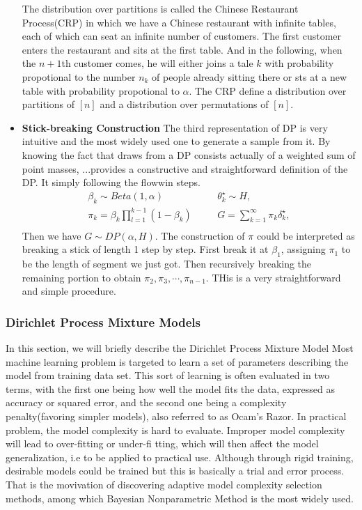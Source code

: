 \documentclass[a4paper,14pt]{article}
\begin{document}
\begin{itemize}
	The distribution over partitions is called the Chinese Restaurant Process(CRP) in which we have a Chinese restaurant with infinite tables, each of which can seat an infinite number of customers. The first customer enters the restaurant and sits at the first table. And in the following, when the $n+1$th customer comes, he will either joins a tale $k$ with probability propotional to the number $n_k$ of people already sitting there or sts at a new table with probability propotional to $\alpha$. The CRP define a distribution over partitions of $[n]$ and a distribution over permutations of $[n]$. 
	\item \textbf{Stick-breaking Construction} 
	The  third representation of DP is very intuitive and the most widely used one to generate a sample from it. By knowing the fact that draws from a DP consists actually of a weighted sum of point masses, ...provides a constructive and straightforward definition of the DP. It simply following the flowwin steps.
	\begin{eqnarray}
	\beta_k\sim Beta(1,\alpha)&\quad&\theta_k^\star\sim H,\\
	\pi_k=\beta_k\prod_{l=1}^{k-1}(1-\beta_k)&\quad&G=\sum_{k=1}^{\infty}\pi_k\delta_k^\star,\\
	\end{eqnarray}
	Then we have $G\sim DP(\alpha,H)$. The construction of $\pi$ could be interpreted as breaking a stick of length 1 step by step. First break it at $\beta_1$, assigning $\pi_1$ to be the length of segment we just got. Then recursively breaking the remaining portion to obtain $\pi_2,\pi_3,\cdots,\pi_{n-1}$. THis is a very straightforward and simple procedure.
\end{itemize}   

\subsubsection{ Dirichlet Process Mixture Models}\label{bnp}
In this section, we will briefly describe the Dirichlet Process Mixture Model
Most machine learning problem is targeted to learn a set of parameters describing the model from training data set. This sort of learning is often evaluated in two terms, with the first one being how well the model fits the data, expressed as accuracy or squared error, and the second one being a complexity penalty(favoring simpler models)\cite{gershma2012tutorial,escobar1995bayesian}, also referred to as Ocam's Razor. In practical problem, the model complexity is hard to evaluate. Improper model complexity will lead to over-fitting or under-fi tting\cite{gershman2012tutorial,muller2004nonparametric}, which will then affect the model generalization, i.e to be applied to practical use. Although through rigid training, desirable models could be trained but this is basically a trial and error process\cite{hjort2010bayesian}. That is the movivation of discovering adaptive model complexity selection methods, among which Bayesian Nonparametric Method is the most widely used.
\end{document}
